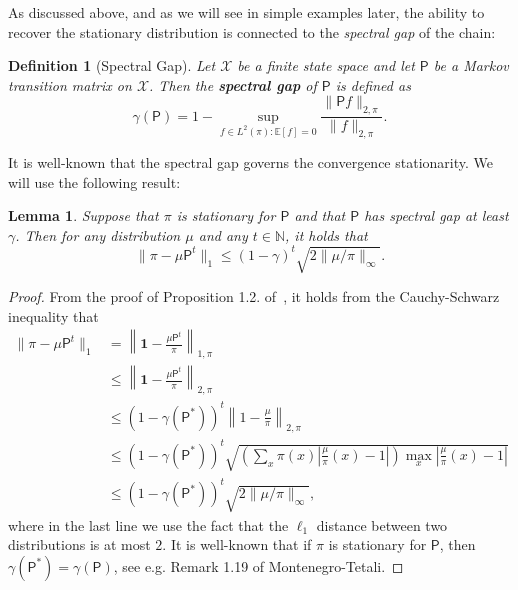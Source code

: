 \documentclass[11pt]{article}
\newtheorem{defn}[thm]{Definition}
\newtheorem{lem}[thm]{Lemma}
\theoremstyle{remark}
\begin{document}
As discussed above, and as we will see in simple examples later, the ability to recover the stationary distribution is connected to the \emph{spectral gap} of the chain:
\begin{defn}[Spectral Gap]
    Let $\mathcal{X}$ be a finite state space and let $\mathsf{P}$ be a Markov transition matrix on $\mathcal{X}$. Then the \textbf{spectral gap} of $\mathsf{P}$ is defined as 
    \begin{equation*}
        \gamma(\mathsf{P})=1-\sup_{f\in L^2(\pi): \mathbb{E}[f]=0}\frac{\|\mathsf{P}f\|_{2,\pi}}{\|f\|_{2,\pi}}.
    \end{equation*}
\end{defn}

It is well-known that the spectral gap governs the convergence stationarity. We will use the following result:


\begin{lem}
\label{lem:mixing}
    Suppose that $\pi$ is stationary for $\mathsf{P}$ and that $\mathsf{P}$ has spectral gap at least $\gamma$. Then for any distribution $\mu$ and any $t\in \mathbb{N}$, it holds that
    \begin{equation*}
        \|\pi-\mu\mathsf{P}^t\|_1\leq (1-\gamma)^t\sqrt{2\|\mu/\pi\|_{\infty}}.
    \end{equation*}
\end{lem}
\begin{proof}
    From the proof of Proposition 1.2. of~\cite{montenegro2006mathematical}, it holds from the Cauchy-Schwarz inequality that
    \begin{align*}
        \|\pi-\mu \mathsf{P}^t\|_1&=\left\|\bm{1}-\frac{\mu\mathsf{P}^t}{\pi}\right\|_{1,\pi}\\
        &\leq \left\|\bm{1}-\frac{\mu\mathsf{P}^t}{\pi}\right\|_{2,\pi}\\
        &\leq (1-\gamma(\mathsf{P}^*))^t \left\|1-\frac{\mu}{\pi}\right\|_{2,\pi}\\
        &\leq (1-\gamma(\mathsf{P}^*))^t \sqrt{\left(\sum_{x}\pi(x)\left\vert \frac{\mu}{\pi}(x)-1\right\vert\right)\max_{x}\left\vert \frac{\mu}{\pi}(x)-1\right\vert}\\    
        &\leq (1-\gamma(\mathsf{P}^*))^t\sqrt{2\|\mu/\pi\|_{\infty}},
    \end{align*}
    where in the last line we use the fact that the $\ell_1$ distance between two distributions is at most $2$. It is well-known that if $\pi$ is stationary for $\mathsf{P}$, then $\gamma(\mathsf{P}^*)=\gamma(\mathsf{P})$, see e.g. Remark 1.19 of Montenegro-Tetali.
\end{proof}
\end{document}
